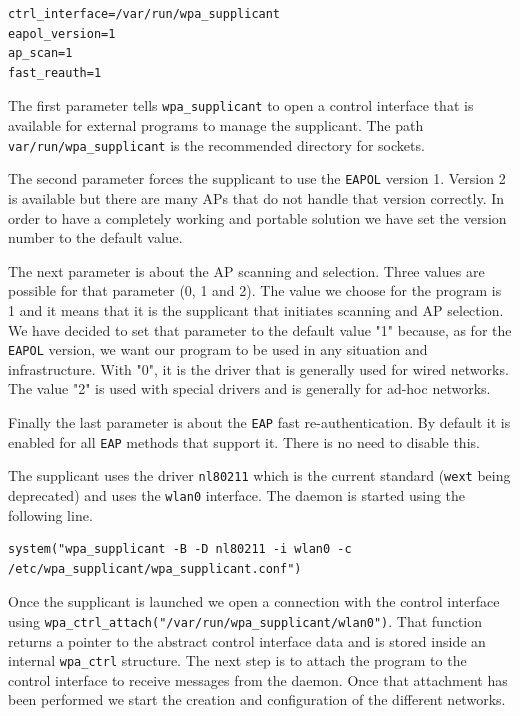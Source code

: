 \begin{lstlisting}[frame=single,breaklines=true,caption={\texttt{wpa\_supplicant.conf}}]
ctrl_interface=/var/run/wpa_supplicant
eapol_version=1
ap_scan=1
fast_reauth=1
\end{lstlisting}

\par The first parameter tells \texttt{wpa\_supplicant} to open a control interface that is available for external programs to manage the supplicant. The path \texttt{var/run/wpa\_supplicant} is the recommended directory for sockets. 

The second parameter forces the supplicant to use the \texttt{EAPOL} version 1. Version 2 is available but there are many APs that do not handle that version correctly. In order to have a completely working and portable solution we have set the version number to the default value.

The next parameter is about the AP scanning and selection. Three values are possible for that parameter (0, 1 and 2). The value we choose for the program is 1 and it means that it is the supplicant that initiates scanning and AP selection. We have decided to set that parameter to the default value "1" because, as for the \texttt{EAPOL} version, we want our program to be used in any situation and infrastructure. With "0", it is the driver that is generally used for wired networks. The value "2" is used with special drivers and is generally for ad-hoc networks.

Finally the last parameter is about the \texttt{EAP} fast re-authentication. By default it is enabled for all \texttt{EAP} methods that support it. There is no need to disable this.


The supplicant uses the driver \texttt{nl80211} which is the current standard (\texttt{wext} being deprecated) and uses the \texttt{wlan0} interface. The daemon is started using the following line.\\

\begin{lstlisting}[frame=single,breaklines=true,caption={Starting the \texttt{wpa\_supplicant} daemon}]
system("wpa_supplicant -B -D nl80211 -i wlan0 -c /etc/wpa_supplicant/wpa_supplicant.conf")
\end{lstlisting}

Once the supplicant is launched we open a connection with the control interface using \texttt{wpa\_ctrl\_attach("/var/run/wpa\_supplicant/wlan0")}. That function returns a pointer to the abstract control interface data and is stored inside an internal \texttt{wpa\_ctrl} structure. The next step is to attach the program to the control interface to receive messages from the daemon. Once that attachment has been performed we start the creation and configuration of the different networks.

